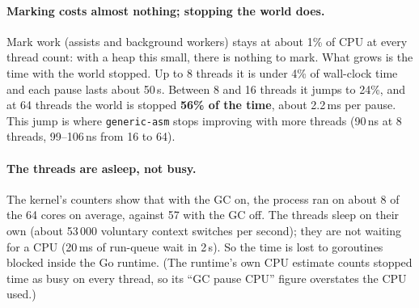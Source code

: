 \documentclass[10pt,a4paper]{article}
\begin{document}



\paragraph{Marking costs almost nothing; stopping the world does.} Mark work (assists and
background workers) stays at about 1\% of CPU at every thread count: with a heap this small,
there is nothing to mark. What grows is the time with the world stopped. Up to 8 threads it is
under 4\% of wall-clock time and each pause lasts about 50\,\textmu s. Between 8 and
16 threads it jumps to 24\%, and at 64 threads the world is stopped \textbf{56\% of the time},
about 2.2\,ms per pause. This jump is where \texttt{generic-asm} stops improving with more
threads (90\,ns at 8 threads, 99--106\,ns from 16 to 64).

\paragraph{The threads are asleep, not busy.} The kernel's counters show that with the GC
on, the process ran on about 8 of the 64 cores on average, against 57 with the GC off. The
threads sleep on their own (about 53\,000 voluntary context switches per second); they are
not waiting for a CPU (20\,ms of run-queue wait in 2\,s). So the time is lost to goroutines
blocked inside the Go runtime. (The runtime's own CPU estimate counts stopped time as busy
on every thread, so its ``GC pause CPU'' figure overstates the CPU used.)
\end{document}
